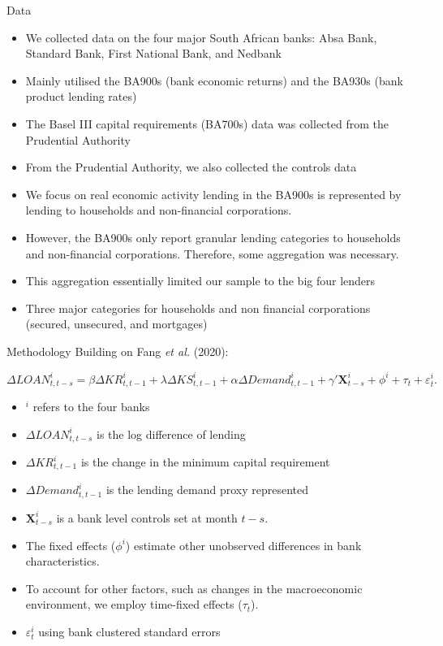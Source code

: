\documentclass[
  14,
  ignorenonframetext,
  aspectratio=141,
]{beamer}
\providecommand{\tightlist}{%
  \setlength{\itemsep}{0pt}\setlength{\parskip}{0pt}}
\begin{document}
\begin{frame}{Data}
\protect\hypertarget{data}{}
\begin{itemize}
\tightlist
\item
  We collected data on the four major South African banks: Absa Bank,
  Standard Bank, First National Bank, and Nedbank
\item
  Mainly utilised the BA900s (bank economic returns) and the BA930s
  (bank product lending rates)
\item
  The Basel III capital requirements (BA700s) data was collected from
  the Prudential Authority
\item
  From the Prudential Authority, we also collected the controls data
\item
  We focus on real economic activity lending in the BA900s is
  represented by lending to households and non-financial corporations.
\item
  However, the BA900s only report granular lending categories to
  households and non-financial corporations. Therefore, some aggregation
  was necessary.
\item
  This aggregation essentially limited our sample to the big four
  lenders
\item
  Three major categories for households and non financial corporations
  (secured, unsecured, and mortgages)
\end{itemize}
\end{frame}

\begin{frame}{Methodology}
\protect\hypertarget{methodology}{}
Building on Fang \emph{et al.} (2020):

\(\Delta LOAN^i_{t, t-s} = \beta \Delta KR^i_{t, t-1} + \lambda \Delta KS^i_{t, t-1} + \alpha \Delta Demand^i_{t, t-1} + \gamma' \pmb{X}^i_{t-s} + \phi^i + \tau_t + \varepsilon^i_t.\)

\begin{itemize}
\tightlist
\item
  \(^i\) refers to the four banks
\item
  \(\Delta LOAN^i_{t, t-s}\) is the log difference of lending
\item
  \(\Delta KR^i_{t, t-1}\) is the change in the minimum capital
  requirement
\item
  \(\Delta Demand^i_{t, t-1}\) is the lending demand proxy represented
\item
  \(\pmb{X}^i_{t-s}\) is a bank level controls set at month \(t-s\).
\item
  The fixed effects (\(\phi^i\)) estimate other unobserved differences
  in bank characteristics.
\item
  To account for other factors, such as changes in the macroeconomic
  environment, we employ time-fixed effects (\(\tau_t\)).
\item
  \(\varepsilon^i_t\) using bank clustered standard errors
\end{itemize}
\end{frame}
\end{document}
